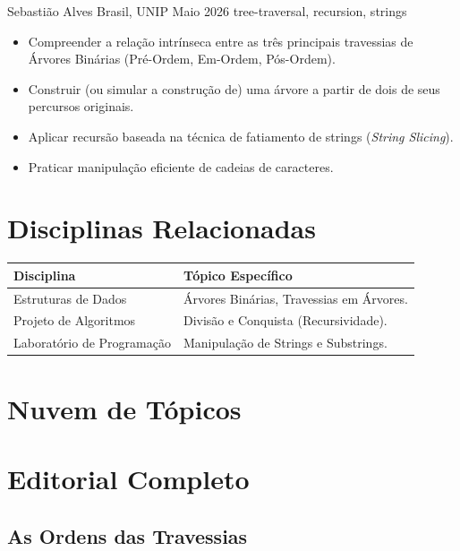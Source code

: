 \documentclass[11pt,a4paper]{article}
\begin{document}
  {Sebastião Alves Brasil, UNIP}
  {Maio 2026}
  {tree-traversal, recursion, strings}

\begin{objetivobox}
\begin{itemize}
  \item Compreender a relação intrínseca entre as três principais travessias de Árvores Binárias (Pré-Ordem, Em-Ordem, Pós-Ordem).
  \item Construir (ou simular a construção de) uma árvore a partir de dois de seus percursos originais.
  \item Aplicar recursão baseada na técnica de fatiamento de strings (\textit{String Slicing}).
  \item Praticar manipulação eficiente de cadeias de caracteres.
\end{itemize}
\end{objetivobox}

\section{Disciplinas Relacionadas}
\begin{center}
\begin{tabularx}{\textwidth}{l X}
\toprule
\textbf{Disciplina} & \textbf{Tópico Específico} \\
\midrule
Estruturas de Dados & Árvores Binárias, Travessias em Árvores. \\
Projeto de Algoritmos & Divisão e Conquista (Recursividade). \\
Laboratório de Programação & Manipulação de Strings e Substrings. \\
\bottomrule
\end{tabularx}
\end{center}

\section{Nuvem de Tópicos}

\section{Editorial Completo}

\subsection{As Ordens das Travessias}
\end{document}
